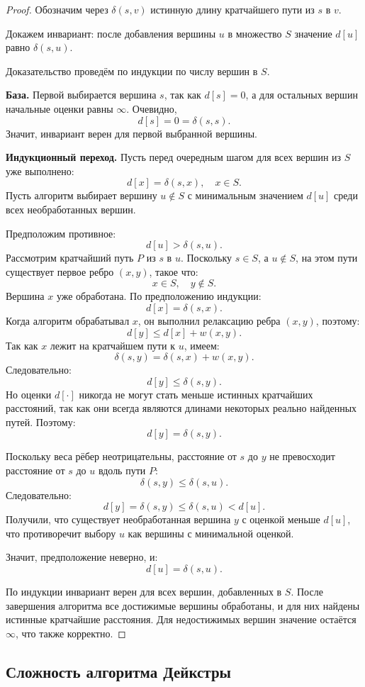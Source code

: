 \documentclass[12pt,a4paper]{article}
\begin{document}
\begin{proof}
Обозначим через $\delta(s,v)$ истинную длину кратчайшего пути из $s$ в $v$.

Докажем инвариант: после добавления вершины $u$ в множество $S$ значение $d[u]$ равно $\delta(s,u)$.

Доказательство проведём по индукции по числу вершин в $S$.

\textbf{База.}
Первой выбирается вершина $s$, так как $d[s]=0$, а для остальных вершин начальные оценки равны $\infty$. Очевидно,
\[
d[s]=0=\delta(s,s).
\]
Значит, инвариант верен для первой выбранной вершины.

\textbf{Индукционный переход.}
Пусть перед очередным шагом для всех вершин из $S$ уже выполнено:
\[
d[x]=\delta(s,x), \quad x \in S.
\]
Пусть алгоритм выбирает вершину $u \notin S$ с минимальным значением $d[u]$ среди всех необработанных вершин.

Предположим противное:
\[
d[u] > \delta(s,u).
\]
Рассмотрим кратчайший путь $P$ из $s$ в $u$. Поскольку $s \in S$, а $u \notin S$, на этом пути существует первое ребро $(x,y)$, такое что:
\[
x \in S,\quad y \notin S.
\]
Вершина $x$ уже обработана. По предположению индукции:
\[
d[x]=\delta(s,x).
\]
Когда алгоритм обрабатывал $x$, он выполнил релаксацию ребра $(x,y)$, поэтому:
\[
d[y] \leq d[x] + w(x,y).
\]
Так как $x$ лежит на кратчайшем пути к $u$, имеем:
\[
\delta(s,y)=\delta(s,x)+w(x,y).
\]
Следовательно:
\[
d[y] \leq \delta(s,y).
\]
Но оценки $d[\cdot]$ никогда не могут стать меньше истинных кратчайших расстояний, так как они всегда являются длинами некоторых реально найденных путей. Поэтому:
\[
d[y]=\delta(s,y).
\]

Поскольку веса рёбер неотрицательны, расстояние от $s$ до $y$ не превосходит расстояние от $s$ до $u$ вдоль пути $P$:
\[
\delta(s,y) \leq \delta(s,u).
\]
Следовательно:
\[
d[y] = \delta(s,y) \leq \delta(s,u) < d[u].
\]
Получили, что существует необработанная вершина $y$ с оценкой меньше $d[u]$, что противоречит выбору $u$ как вершины с минимальной оценкой.

Значит, предположение неверно, и:
\[
d[u]=\delta(s,u).
\]

По индукции инвариант верен для всех вершин, добавленных в $S$. После завершения алгоритма все достижимые вершины обработаны, и для них найдены истинные кратчайшие расстояния. Для недостижимых вершин значение остаётся $\infty$, что также корректно.
\end{proof}

\subsection{Сложность алгоритма Дейкстры}
\end{document}
